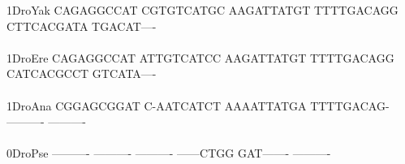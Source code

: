 \documentclass[11pt,twoside,reqno,a4paper]{article}
\begin{document}
{1\hspace*{4\charwidth}DroYak	CAGAGGCCAT	CGTGTCATGC	AAGATTATGT	TTTTGACAGG	CTTCACGATA	TGACAT----	\\
\hspace*{5\charwidth}\hspace*{7\charwidth}\hspace*{1\charwidth}\hspace*{1\charwidth}\hspace*{1\charwidth}\hspace*{1\charwidth}\hspace*{1\charwidth}\hspace*{1\charwidth}\\
1\hspace*{4\charwidth}DroEre	CAGAGGCCAT	ATTGTCATCC	AAGATTATGT	TTTTGACAGG	CATCACGCCT	GTCATA----	\\
\hspace*{5\charwidth}\hspace*{7\charwidth}\hspace*{1\charwidth}\hspace*{1\charwidth}\hspace*{1\charwidth}\hspace*{1\charwidth}\hspace*{1\charwidth}\hspace*{1\charwidth}\\
1\hspace*{4\charwidth}DroAna	CGGAGCGGAT	C-AATCATCT	AAAATTATGA	TTTTGACAG-	----------	----------	\\
\hspace*{5\charwidth}\hspace*{7\charwidth}\hspace*{1\charwidth}\hspace*{1\charwidth}\hspace*{1\charwidth}\hspace*{1\charwidth}\hspace*{1\charwidth}\hspace*{1\charwidth}\\
0\hspace*{4\charwidth}DroPse	----------	----------	----------	------CTGG	GAT-------	----------	\\
\hspace*{5\charwidth}\hspace*{7\charwidth}\hspace*{1\charwidth}\hspace*{1\charwidth}\hspace*{1\charwidth}\hspace*{1\charwidth}\hspace*{1\charwidth}\hspace*{1\charwidth}\\
}
\end{document}
